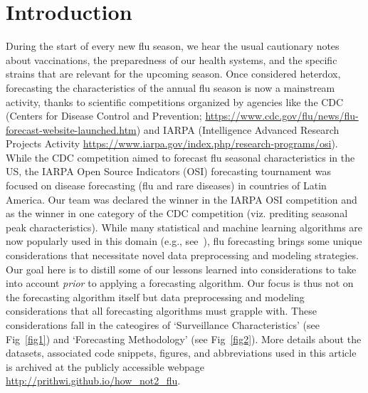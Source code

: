 \documentclass[10pt,letterpaper]{article}
\newcommand{\narenc}[1]{{\color{black}\textrm{#1}}}
\begin{document}
\section*{Introduction}
\narenc{During the start of every new flu season, we hear the usual cautionary
notes about vaccinations, the preparedness of our health systems, and the
specific strains that are relevant for the upcoming season. Once considered
heterdox, forecasting the characteristics of the annual flu season is now a
mainstream activity, thanks to scientific competitions organized by agencies
like the CDC (Centers for Disease Control and Prevention;
\url{https://www.cdc.gov/flu/news/flu-forecast-website-launched.htm}) and IARPA
(Intelligence Advanced Research Projects Activity
\url{https://www.iarpa.gov/index.php/research-programs/osi}).} While the CDC
competition aimed to forecast flu seasonal characteristics in the US, the IARPA
Open Source Indicators (OSI) forecasting tournament was focused on disease
forecasting (flu and rare diseases) in countries of Latin America.  Our team
was declared the winner in the IARPA OSI competition and \narenc{as the winner
in one category of the CDC competition (viz.  prediting seasonal peak
characteristics).  While many statistical and machine learning algorithms are
now popularly used in this domain (e.g.,
see~\cite{chakraborty2014forecasting,shaman2013real,goldstein2011predicting}),
flu forecasting brings some unique considerations that necessitate novel data
preprocessing and modeling strategies.  Our goal here is to distill some of our
lessons learned into considerations to take into account {\it prior} to
applying a forecasting algorithm. Our focus is thus not on the forecasting
algorithm itself but data preprocessing and modeling considerations that all
forecasting algorithms must grapple with. These considerations fall in the
cateogires of `Surveillance Characteristics' (see Fig~\ref{fig1}) and
`Forecasting Methodology' (see Fig~\ref{fig2}). 
More details about the datasets, associated code snippets, figures, and abbreviations
used in this article is archived at the
publicly accessible webpage \url{http://prithwi.github.io/how_not2_flu}.}

\end{document}
